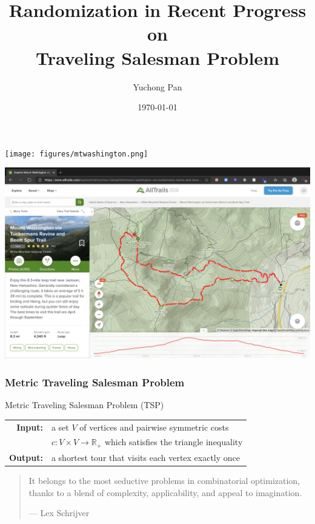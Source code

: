 \documentclass{beamer}
\title{Randomization in Recent Progress on \\ Traveling Salesman Problem}
\author{Yuchong Pan}
\institute{MIT 6.842}
\date{\today}
\newcommand{\RR}{\mathbb{R}}
\begin{document}
  \frame{\titlepage}

  \begin{frame}
  
    \centering
    \texttt{[image: figures/mtwashington.png]}
  
  \end{frame}

  \begin{frame}

    \centering
    \includegraphics[width=\textwidth]{figures/tuckermans.png}
  
  \end{frame}

  \begin{frame}
    \frametitle{Metric Traveling Salesman Problem}
  
    \begin{block}{Metric Traveling Salesman Problem (TSP)}
      \begin{tabular}{rl}
        {\bf Input:} & a set $V$ of vertices and pairwise symmetric costs \\
        & $c : V \times V \to \RR_+$ which satisfies the triangle inequality \\
        {\bf Output:} & a shortest tour that visits each vertex exactly once
      \end{tabular}
    \end{block}

    \pause

    \bigskip

    \begin{quote}
      It belongs to the most seductive problems in combinatorial optimization, thanks to a blend of complexity, applicability, and appeal to imagination.

      \begin{flushright}
        --- Lex Schrijver
      \end{flushright}
    \end{quote}
  
  \end{frame}
\end{document}

